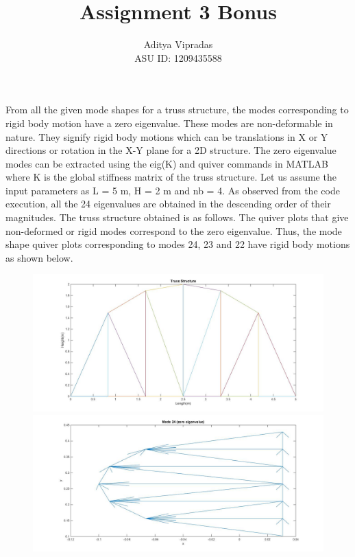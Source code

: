 \documentclass[12pt]{article}
\title{Assignment 3 Bonus}
\author{Aditya Vipradas\\ASU ID: 1209435588}
\begin{document}
\maketitle
From all the given mode shapes for a truss structure, the modes corresponding to rigid body motion have a zero eigenvalue. These modes are non-deformable in nature. They signify rigid body motions which can be translations in X or Y directions or rotation in the X-Y plane for a 2D structure. The zero eigenvalue modes can be extracted using the eig(K) and quiver commands in MATLAB where K is the global stiffness matrix of the truss structure. Let us assume the input parameters as L = 5 m, H = 2 m and nb = 4. As observed from the code execution, all the 24 eigenvalues are obtained in the descending order of their magnitudes. The truss structure obtained is as follows. The quiver plots that give non-deformed or rigid modes correspond to the zero eigenvalue. Thus, the mode shape quiver plots corresponding to modes 24, 23 and 22 have rigid body motions as shown below.
\begin{figure}[ht]
  \begin{minipage}[b]{0.4\textwidth}
    \includegraphics[scale=0.2]{truss.jpg}
  \end{minipage}
  \hfill
  \begin{minipage}[b]{0.5\textwidth}
    \includegraphics[scale=0.2]{mode24.jpg}
  \end{minipage}
\end{figure}
\end{document}
